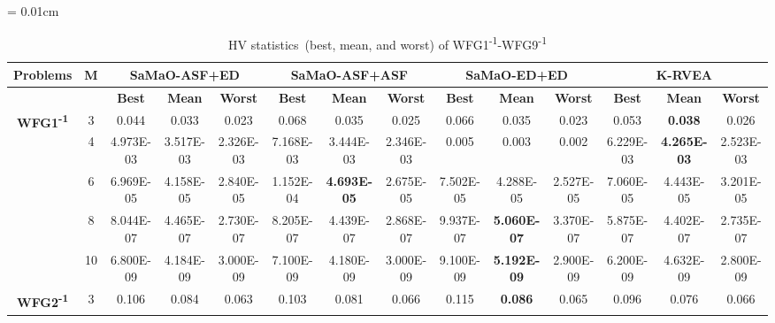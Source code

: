 \documentclass[onecolumn,10pt]{asme2ej}
\begin{document}
\begin{table}[!htb]\scriptsize
	\centering
	\caption{HV statistics~(best, mean, and worst) of WFG1\textsuperscript{-1}-WFG9\textsuperscript{-1}}
	\label{tab:KHTTab:4}
	\tabcolsep = 0.01cm
	\begin{tabular}{|c|c|c|c|c|c|c|c|c|c|c|c|c|c|}
	\hline
	\textbf{Problems}                                    & \textbf{M} & \multicolumn{3}{c|}{\textbf{SaMaO-ASF+ED}}          & \multicolumn{3}{c|}{\textbf{SaMaO-ASF+ASF}}         & \multicolumn{3}{c|}{\textbf{SaMaO-ED+ED}}           & \multicolumn{3}{c|}{\textbf{K-RVEA}}                \\ \hline
	\textbf{}                                            & \textbf{}  & \textbf{Best} & \textbf{Mean}      & \textbf{Worst} & \textbf{Best} & \textbf{Mean}      & \textbf{Worst} & \textbf{Best} & \textbf{Mean}      & \textbf{Worst} & \textbf{Best} & \textbf{Mean}      & \textbf{Worst} \\ \hline
	\multirow{5}{*}{\textbf{WFG1\textsuperscript{-1}}} & 3          & 0.044         & 0.033              & 0.023          & 0.068         & 0.035              & 0.025          & 0.066         & 0.035              & 0.023          & 0.053         & \textbf{0.038}     & 0.026          \\ \cline{2-14} 
	& 4          & 4.973E-03     & 3.517E-03          & 2.326E-03      & 7.168E-03     & 3.444E-03          & 2.346E-03      & 0.005         & 0.003              & 0.002          & 6.229E-03     & \textbf{4.265E-03} & 2.523E-03      \\ \cline{2-14} 
	& 6          & 6.969E-05     & 4.158E-05          & 2.840E-05      & 1.152E-04     & \textbf{4.693E-05} & 2.675E-05      & 7.502E-05     & 4.288E-05          & 2.527E-05      & 7.060E-05     & 4.443E-05          & 3.201E-05      \\ \cline{2-14} 
	& 8          & 8.044E-07     & 4.465E-07          & 2.730E-07      & 8.205E-07     & 4.439E-07          & 2.868E-07      & 9.937E-07     & \textbf{5.060E-07} & 3.370E-07      & 5.875E-07     & 4.402E-07          & 2.735E-07      \\ \cline{2-14} 
	& 10         & 6.800E-09     & 4.184E-09          & 3.000E-09      & 7.100E-09     & 4.180E-09          & 3.000E-09      & 9.100E-09     & \textbf{5.192E-09} & 2.900E-09      & 6.200E-09     & 4.632E-09          & 2.800E-09      \\ \hline
	\multirow{5}{*}{\textbf{WFG2\textsuperscript{-1}}} & 3          & 0.106         & 0.084              & 0.063          & 0.103         & 0.081              & 0.066          & 0.115         & \textbf{0.086}     & 0.065          & 0.096         & 0.076              & 0.066          \\ \cline{2-14} 

\end{tabular}
\end{table}
\end{document}
